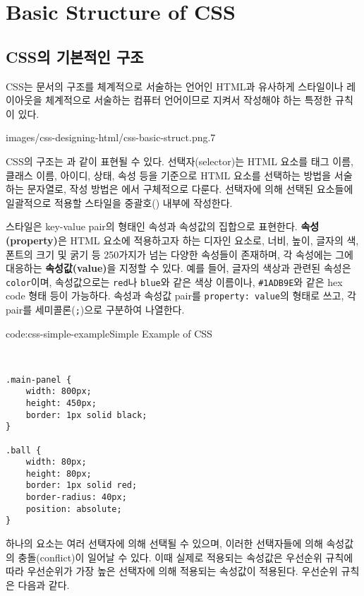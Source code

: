 \section{Basic Structure of CSS} \label{sect:basic-structure-of-css}

\subsection*{CSS의 기본적인 구조}

CSS는 문서의 구조를 체계적으로 서술하는 언어인 HTML과 유사하게 스타일이나 레이아웃을 체계적으로 서술하는 컴퓨터 언어이므로 지켜서 작성해야 하는 특정한 규칙이 있다.

    {images/css-designing-html/css-basic-struct.png}{.7}

CSS의 구조는 과 같이 표현될 수 있다. 선택자(selector)는 HTML 요소를 태그 이름, 클래스 이름, 아이디, 상태, 속성 등을 기준으로 HTML 요소를 선택하는 방법을 서술하는 문자열로, 작성 방법은 에서 구체적으로 다룬다. 선택자에 의해 선택된 요소들에 일괄적으로 적용할 스타일을 중괄호(\texttt{{}}) 내부에 작성한다.

스타일은 key-value pair의 형태인 속성과 속성값의 집합으로 표현한다. \textbf{속성(property)}은 HTML 요소에 적용하고자 하는 디자인 요소로, 너비, 높이, 글자의 색, 폰트의 크기 및 굵기 등 250가지가 넘는 다양한 속성들이 존재하며, 각 속성에는 그에 대응하는 \textbf{속성값(value)}을 지정할 수 있다. 예를 들어, 글자의 색상과 관련된 속성은 \texttt{color}이며, 속성값으로는 \texttt{red}나 \texttt{blue}와 같은 색상 이름이나, \texttt{\#1ADB9E}와 같은 hex code 형태 등이 가능하다. 속성과 속성값 pair를 \verb|property: value|의 형태로 쓰고, 각 pair를 세미콜론(\texttt{;})으로 구분하여 나열한다.

\begin{codeenv}{code:css-simple-example}{Simple Example of CSS}\begin{verbatim}


.main-panel {
    width: 800px;
    height: 450px;
    border: 1px solid black;
}

.ball {
    width: 80px;
    height: 80px;
    border: 1px solid red;
    border-radius: 40px;
    position: absolute;
}
\end{verbatim}
\end{codeenv}

하나의 요소는 여러 선택자에 의해 선택될 수 있으며, 이러한 선택자들에 의해 속성값의 충돌(conflict)이 일어날 수 있다. 이때 실제로 적용되는 속성값은 우선순위 규칙에 따라 우선순위가 가장 높은 선택자에 의해 적용되는 속성값이 적용된다. 우선순위 규칙은 다음과 같다.

